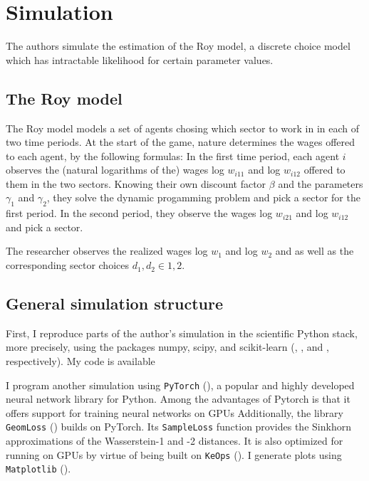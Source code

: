 \section{Simulation}
\label{sec:simulation}

The authors simulate the estimation of the Roy model, a discrete choice model which has intractable likelihood for certain parameter values.

\subsection{The Roy model}
\label{sec:roy}

The Roy model models a set of agents chosing which sector to work in in each of two time periods.
At the start of the game, nature determines the wages offered to each agent, by the following formulas:
In the first time period, each agent $i$ observes the (natural logarithms of the) wages log $w_{i11}$ and log $w_{i12}$ offered to them in the two sectors.
Knowing their own discount factor $\beta$ and the parameters $\gamma_1$ and $\gamma_2$, they solve the dynamic progamming problem
and pick a sector for the first period.
In the second period, they observe the wages log $w_{i21}$ and log $w_{i12}$ and pick a sector. %

The researcher observes the realized wages log $w_1$ and log $w_2$ and as well as the corresponding sector choices $d_1, d_2 \in {1, 2}$.

\subsection{General simulation structure}

First, I reproduce parts of the author's simulation in the scientific Python stack, more precisely, using the packages numpy, scipy, and scikit-learn (\textcite{harris2020array}, \textcite{2020SciPy-NMeth}, and \textcite{scikit-learn}, respectively).
My code is available %

I program another simulation using \texttt{PyTorch} (\cite{Ansel_PyTorch_2_Faster_2024}), a popular and highly developed neural network library for Python.
Among the advantages of Pytorch is that it offers support for training neural networks on GPUs %
Additionally, the library \texttt{GeomLoss} (\cite{feydy2019interpolating}) builds on PyTorch. 
Its \texttt{SampleLoss} function provides the Sinkhorn approximations of the Wasserstein-1 and -2 distances.
It is also optimized for running on GPUs by virtue of being built on \texttt{KeOps} (\cite{KeOps}).
I generate plots using \texttt{Matplotlib} (\cite{Matplotlib}).

